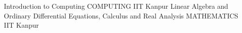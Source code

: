 \begin{cventries}
  \cventry
    {Introduction to Computing}
    {COMPUTING}
    {IIT Kanpur}
    {}
    {}
  \cventry
    {Linear Algebra and Ordinary Differential Equations, Calculus and Real Analysis}
    {MATHEMATICS}
    {IIT Kanpur}
    {}
    {}
\end{cventries}
